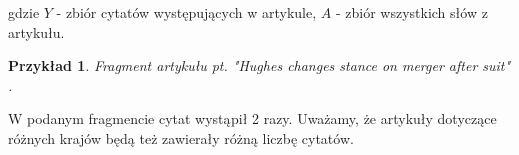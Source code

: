 \documentclass{classrep}
\newtheorem{exmp}{Przykład}[section]
\begin{document}
\begin{enumerate}
\begin{equation}
    \end{equation}
    gdzie $Y$ - zbiór cytatów występujących w artykule, $A$ - zbiór wszystkich słów z artykułu. \\
    \begin{exmp}Fragment artykułu pt. "Hughes changes stance on merger after suit" \cite{reuters} \\
    . \\
    \end{exmp}
    W podanym fragmencie cytat wystąpił 2 razy. Uważamy, że artykuły dotyczące różnych krajów będą też zawierały różną liczbę cytatów. \\


\end{enumerate}
\end{document}

